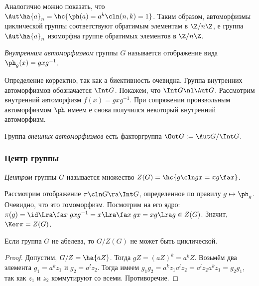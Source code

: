 \documentclass[a4paper]{article}
\begin{document}
Аналогично можно показать, что $\Aut\ha{a}_n = \hc{\ph(a) = a^k\cln (n,k)=1}$. Таким образом, автоморфизмы
циклической группы соответствуют обратимым элементам  в $\Z/n\Z$, е группа $\Aut\ha{a}_n$ изоморфна
группе обратимых элементов в $\Z/n\Z$.

\begin{df}
\emph{Внутренним автоморфизмом} группы $G$ называется отображение вида $\ph_g(x) = gxg^{-1}$.
\end{df}

Определение корректно, так как
а биективность очевидна. Группа внутренних автоморфизмов обозначается $\Int G$.
Покажем, что $\Int G \nl \Aut G$. Рассмотрим внутренний автоморфизм $f(x)=gxg^{-1}$. При сопряжении
произвольным автоморфизмом $\ph$ имеем
е снова получился некоторый внутренний автоморфизм.

\begin{df}
Группа \emph{внешних автоморфизмов} есть факторгруппа $\Out G := \Aut G/\Int G$.
\end{df}

\subsubsection{Центр группы}

\begin{df}
\emph{Центром} группы $G$ называется множество $Z(G) = \hc{g\cln gx=xg \fa x}$.
\end{df}

Рассмотрим отображение $\pi\cln G\ra \Int G$, определенное по правилу $g \mapsto \ph_g$. Очевидно, что это
гомоморфизм. Посмотрим на его ядро: $\pi(g) = \id \Lra \fa x \; gxg^{-1}=x \Lra \fa x \; gx = xg \Lra g \in
Z(G)$. Значит, $\Ker \pi = Z(G)$.

\begin{stm}
Если группа $G$ не абелева, то $G/Z(G)$ не может быть циклической.
\end{stm}
\begin{proof}
Допустим, $G/Z = \ha{aZ}$. Тогда $gZ = (aZ)^k = a^k Z$. Возьмём два элемента  $g_1 = a^kz_1$ и
$g_2=a^lz_2$. Тогда имеем $g_1g_2 = a^k z_1 a^l z_2 = a^l z_2 a^k z_1 = g_2 g_1$, так как $z_1$ и $z_2$
коммутируют со всеми. Противоречие.
\end{proof}
\end{document}
